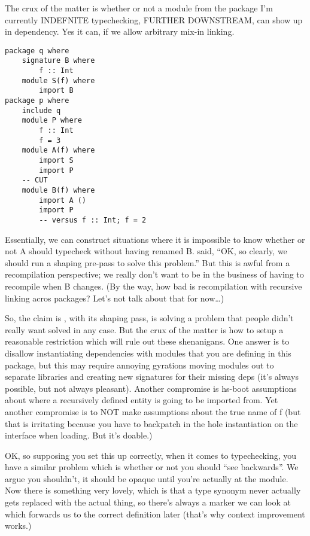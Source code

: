 The crux of the matter is whether or not a module from the package I'm currently
INDEFNITE typechecking, FURTHER DOWNSTREAM, can show up in dependency.
Yes it can, if we allow arbitrary mix-in linking.

\begin{verbatim}
package q where
    signature B where
        f :: Int
    module S(f) where
        import B
package p where
    include q
    module P where
        f :: Int
        f = 3
    module A(f) where
        import S
        import P
    -- CUT
    module B(f) where
        import A ()
        import P
        -- versus f :: Int; f = 2
\end{verbatim}

Essentially, we can construct situations where it is impossible to
know whether or not A should typecheck without having renamed B.
\OldBackpack{} said, ``OK, so clearly, we should run a shaping pre-pass
to solve this problem.''  But this is awful from a recompilation perspective;
we really don't want to be in the business of having to recompile when B
changes.  (By the way, how bad is recompilation with recursive linking
acros packages? Let's not talk about that for now\ldots)

So, the claim is \OldBackpack{}, with its shaping pass, is solving a
problem that people didn't really want solved in any case.  But the crux
of the matter is how to setup a reasonable restriction which will rule
out these shenanigans.  One answer is to disallow instantiating
dependencies with modules that you are defining in this package, but
this may require annoying gyrations moving modules out to separate
libraries and creating new signatures for their missing deps (it's
always possible, but not always pleasant).  Another compromise is
hs-boot assumptions about where a recursively defined entity is going to
be imported from.  Yet another compromise is to NOT make assumptions
about the true name of f (but that is irritating because you have to
backpatch in the hole instantiation on the interface when loading. But
it's doable.)

OK, so supposing you set this up correctly, when it comes to typechecking,
you have a similar problem which is whether or not you should ``see backwards''.
We argue you shouldn't, it should be opaque until you're actually at the
module.  Now there is something very lovely, which is that a type synonym
never actually gets replaced with the actual thing, so there's always a marker
we can look at which forwards us to the correct definition later (that's why
context improvement works.)

